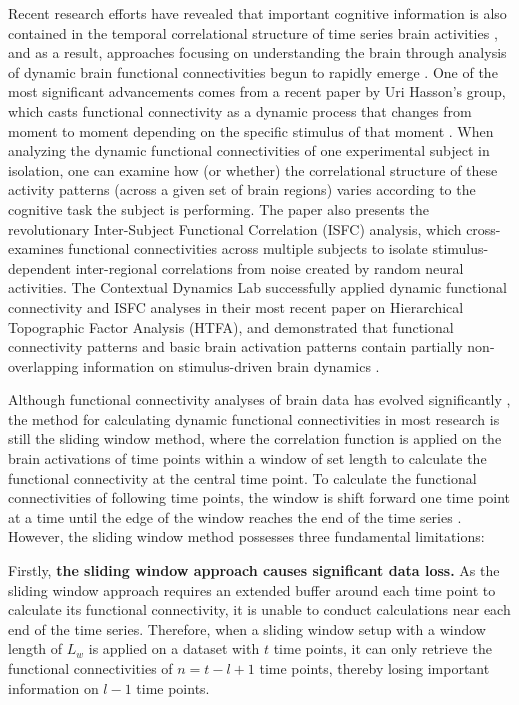 \documentclass[11pt]{article}
\begin{document}
Recent research efforts have revealed that important cognitive information is also contained in the temporal correlational structure of time series brain activities \citep{davidson2016}, and as a result, approaches focusing on understanding the brain through analysis of dynamic brain functional connectivities begun to rapidly emerge \citep{Nigam2016,Hutchinson2013}. One of the most significant advancements comes from a recent paper by Uri Hasson's group, which casts functional connectivity as a dynamic process that changes from moment to moment depending on the specific stimulus of that moment \citep{hasson2016}. When analyzing the dynamic functional connectivities of one experimental subject in isolation, one can examine how (or whether) the correlational structure of these activity patterns (across a given set of brain regions) varies according to the cognitive task the subject is performing. The paper also presents the revolutionary Inter-Subject Functional Correlation (ISFC) analysis, which cross-examines functional connectivities across multiple subjects to isolate stimulus-dependent inter-regional correlations from noise created by random neural activities. The Contextual Dynamics Lab successfully applied dynamic functional connectivity and ISFC analyses in their most recent paper on Hierarchical Topographic Factor Analysis (HTFA), and demonstrated that functional connectivity patterns and basic brain activation patterns contain partially non-overlapping information on stimulus-driven brain dynamics \citep{jeremy2017}.

Although functional connectivity analyses of brain data has evolved significantly \citep{olaf2005,khambhati2017}, the method for calculating dynamic functional connectivities in most research is still the sliding window method, where the correlation function is applied on the brain activations of time points within a window of set length to calculate the functional connectivity at the central time point. To calculate the functional connectivities of following time points, the window is shift forward one time point at a time until the edge of the window reaches the end of the time series \citep{enrico2011,elena2012}. However, the sliding window method possesses three fundamental limitations:

Firstly, \textbf{the sliding window approach causes significant data loss.} As the sliding window approach requires an extended buffer around each time point to calculate its functional connectivity, it is unable to conduct calculations near each end of the time series. Therefore, when a sliding window setup with a window length of $L_w$ is applied on a dataset with $t$ time points, it can only retrieve the functional connectivities of $n=t-l+1$ time points, thereby losing important information on $l-1$ time points.
\end{document}

